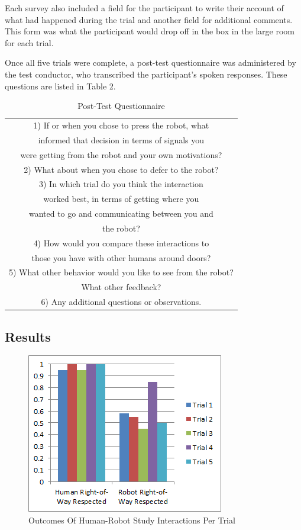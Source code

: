 \documentclass[letterpaper, 10 pt, conference]{ieeeconf}  %
\begin{document}
Each survey also included a field for the participant to write their account of what had happened during the trial and another field for additional comments. This form was what the participant would drop off in the box in the large room for each trial.

Once all five trials were complete, a post-test questionnaire was administered by the test conductor, who transcribed the participant’s spoken responses. These questions are listed in Table 2.

\begin{table}[h]
\caption{Post-Test Questionnaire}
\label{questionnaire_questions}
\begin{center}
\begin{tabular}{|c|}
\hline
1) If or when you chose to press the robot, what \\
informed that decision in terms of signals you \\
were getting from the robot and your own motivations?\\
\hline
2) What about when you chose to defer to the robot?\\
\hline
3) In which trial do you think the interaction \\
worked best, in terms of getting where you \\
wanted to go and communicating between you and \\
the robot?\\
\hline
4) How would you compare these interactions to \\
those you have with other humans around doors?\\
\hline
5) What other behavior would you like to see from the robot? \\
What other feedback?\\
\hline
6) Any additional questions or observations.\\
\hline
\end{tabular}
\end{center}
\end{table}

\subsection{Results}

     \begin{figure}
      \centering
      \includegraphics{outcomes.png}
      \caption{Outcomes Of Human-Robot Study Interactions Per Trial}
      \label{fig:Outcomes}
   \end{figure}
\end{document}
